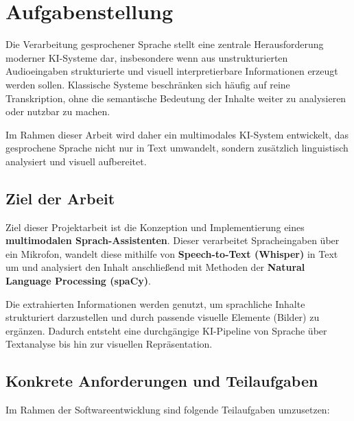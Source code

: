 \chapter{Aufgabenstellung}
\label{sec:aufgabenstellung}

Die Verarbeitung gesprochener Sprache stellt eine zentrale Herausforderung moderner KI-Systeme dar, insbesondere wenn aus unstrukturierten Audioeingaben strukturierte und visuell interpretierbare Informationen erzeugt werden sollen. Klassische Systeme beschränken sich häufig auf reine Transkription, ohne die semantische Bedeutung der Inhalte weiter zu analysieren oder nutzbar zu machen.

Im Rahmen dieser Arbeit wird daher ein multimodales KI-System entwickelt, das gesprochene Sprache nicht nur in Text umwandelt, sondern zusätzlich linguistisch analysiert und visuell aufbereitet.

\section{Ziel der Arbeit}
Ziel dieser Projektarbeit ist die Konzeption und Implementierung eines \textbf{multimodalen Sprach-Assistenten}. Dieser verarbeitet Spracheingaben über ein Mikrofon, wandelt diese mithilfe von \textbf{Speech-to-Text (Whisper)} in Text um und analysiert den Inhalt anschließend mit Methoden der \textbf{Natural Language Processing (spaCy)}.

Die extrahierten Informationen werden genutzt, um sprachliche Inhalte strukturiert darzustellen und durch passende visuelle Elemente (Bilder) zu ergänzen. Dadurch entsteht eine durchgängige KI-Pipeline von Sprache über Textanalyse bis hin zur visuellen Repräsentation.

\section{Konkrete Anforderungen und Teilaufgaben}
Im Rahmen der Softwareentwicklung sind folgende Teilaufgaben umzusetzen:

